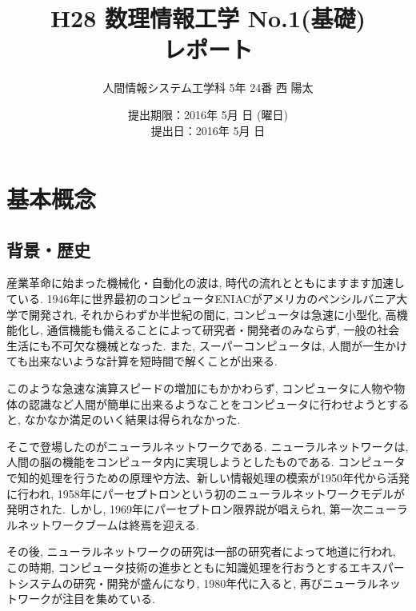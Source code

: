 \documentclass[10pt]{jsarticle}
\begin{document}
	\begin{titlepage}
		\title{\vspace{2cm}H28 数理情報工学 No.1(基礎) \\ レポート\vspace{12cm}}
		\author{人間情報システム工学科 5年 24番 西 陽太}
		\date{提出期限：2016年 5月 日 (曜日) \\ \hspace{-1.3cm}提出日：2016年 5月 日}
		\maketitle
		\thispagestyle{empty}
	\end{titlepage}

\setlength{\oddsidemargin}{-0.4truemm}
\setlength{\evensidemargin}{-0.4truemm}


\section{基本概念}
	\subsection{背景・歴史}
		産業革命に始まった機械化・自動化の波は, 時代の流れとともにますます加速している. 1946年に世界最初のコンピュータENIACがアメリカのペンシルバニア大学で開発され, それからわずか半世紀の間に, コンピュータは急速に小型化, 高機能化し, 通信機能も備えることによって研究者・開発者のみならず, 一般の社会生活にも不可欠な機械となった. また, スーパーコンピュータは, 人間が一生かけても出来ないような計算を短時間で解くことが出来る. \par
		このような急速な演算スピードの増加にもかかわらず, コンピュータに人物や物体の認識など人間が簡単に出来るようなことをコンピュータに行わせようとすると, なかなか満足のいく結果は得られなかった. \par
		そこで登場したのがニューラルネットワークである. ニューラルネットワークは, 人間の脳の機能をコンピュータ内に実現しようとしたものである. コンピュータで知的処理を行うための原理や方法、新しい情報処理の模索が1950年代から活発に行われ, 1958年にパーセプトロンという初のニューラルネットワークモデルが発明された. しかし, 1969年にパーセプトロン限界説が唱えられ, 第一次ニューラルネットワークブームは終焉を迎える. \par
		その後, ニューラルネットワークの研究は一部の研究者によって地道に行われ, この時期, コンピュータ技術の進歩とともに知識処理を行おうとするエキスパートシステムの研究・開発が盛んになり, 1980年代に入ると, 再びニューラルネットワークが注目を集めている.
		
\end{document}

